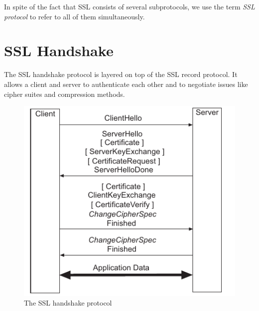 \documentclass[a4paper,12pt]{report}
\begin{document}
In spite of the fact that SSL consists of several subprotocols, we use the term \emph{SSL protocol} to refer to all of them simultaneously.

\section{SSL Handshake}
The SSL handshake protocol is layered on top of the SSL record protocol. It allows a client and server to authenticate each other and to negotiate issues like cipher suites and compression methods.

\begin{figure}[H]
    \centering
    \includegraphics[scale=0.7]{handshake.png}
    \caption{The SSL handshake protocol}
    \label{fig:galaxy}
\end{figure}
\end{document}
